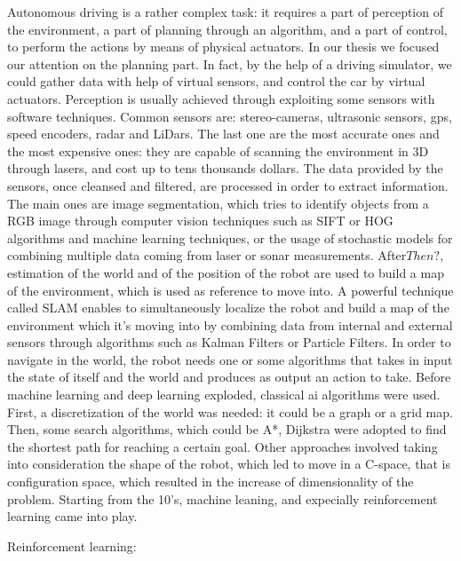 Autonomous driving is a rather complex task: it requires a part of perception of the environment, a part of planning through an algorithm, and a part of control, to perform the actions by means of physical actuators. In our thesis we focused our attention on the planning part. In fact, by the help of a driving simulator, we could gather data with help of virtual sensors, and control the car by virtual actuators.
Perception is usually achieved through exploiting some sensors with software techniques.
Common sensors are: stereo-cameras, ultrasonic sensors, gps, speed encoders, radar and LiDars. The last one are the most accurate ones and the most expensive ones: they are capable of scanning the environment in 3D through lasers, and cost up to tens thousands dollars.
The data provided by the sensors, once cleansed and filtered, are processed in order to extract information. The main ones are image segmentation, which tries to identify objects from a RGB image through computer vision techniques such as SIFT or HOG algorithms and machine learning techniques, or the usage of stochastic models for combining multiple data coming from laser or sonar measurements.
After$Then?$, estimation of the world and of the position of the robot are used to build a map of the environment, which is used as reference to move into.
A powerful technique called SLAM enables to simultaneously localize the robot and build a map of the environment which it's moving into by combining data from internal and external sensors through algorithms such as Kalman Filters or Particle Filters.
In order to navigate in the world, the robot needs one or some algorithms that takes in input the state of itself and the world and produces as output an action to take.
Before machine learning and deep learning exploded, classical ai algorithms were used.
First, a discretization of the world was needed: it could be a graph or a grid map. Then, some search algorithms, which could be A*, Dijkstra were adopted to find the shortest path for reaching a certain goal.
Other approaches involved taking into consideration the shape of the robot, which led to move in a C-space, that is configuration space, which resulted in the increase of dimensionality of the problem.
Starting from the 10's, machine leaning, and expecially reinforcement learning came into play.
	
	
Reinforcement learning:



